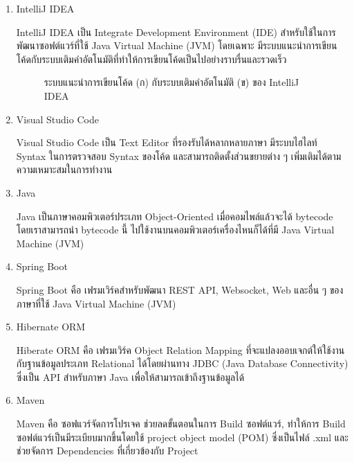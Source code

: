 \begin{enumerate}
	\item IntelliJ IDEA
	
	IntelliJ IDEA เป็น Integrate Development Environment (IDE) สำหรับใช้ในการพัฒนาซอฟต์แวร์ที่ใช้ Java Virtual Machine (JVM) โดยเฉพาะ มีระบบแนะนำการเขียนโค้ดกับระบบเติมคำอัตโนมัติที่ทำให้การเขียนโค้ดเป็นไปอย่างราบรื่นและรวดเร็ว ~\cite{intellij}
	
	\begin{figure}[!h]
		\centering
		\caption{ระบบแนะนำการเขียนโค้ด (ก) กับระบบเติมคำอัตโนมัติ (ข) ของ IntelliJ IDEA}
		\label{Fig:intellij}
	\end{figure}
	
	\item Visual Studio Code
	
	Visual Studio Code เป็น Text Editor ที่รองรับได้หลากหลายภาษา มีระบบไฮไลท์ Syntax ในการตรวจสอบ Syntax ของโค้ด และสามารถติดตั้งส่วนขยายต่าง ๆ เพิ่มเติมได้ตามความเหมาะสมในการทำงาน ~\cite{vscode}
	
	\item Java
	
	Java เป็นภาษาคอมพิวเตอร์ประเภท Object-Oriented เมื่อคอมไพล์แล้วจะได้ bytecode โดยเราสามารถนำ bytecode นี้ ไปใช้งานบนคอมพิวเตอร์เครื่องไหนก็ได้ที่มี Java Virtual Machine (JVM) ~\cite{java}
	
	\item Spring Boot
	
	Spring Boot คือ เฟรมเวิร์คสำหรับพัฒนา REST API, Websocket, Web และอื่น ๆ ของภาษาที่ใช้ Java Virtual Machine (JVM) ~\cite{spring}
	
	\item Hibernate ORM
	
	Hiberate ORM คือ เฟรมเวิร์ค Object Relation Mapping ที่จะแปลงออบเจกต์ให้ใช้งานกับฐานข้อมูลประเภท Relational ได้โดยผ่านทาง JDBC (Java Database Connectivity) ซึ่งเป็น API สำหรับภาษา Java เพื่อให้สามารถเข้าถึงฐานข้อมูลได้ ~\cite{hibernate}

	\item Maven
	
	Maven คือ ซอฟแวร์จัดการโปรเจค ช่วยลดขั้นตอนในการ Build ซอฟต์แวร์, ทำให้การ Build ซอฟต์แวร์เป็นมีระเบียบมากขึ้นโดยใช้ project object model (POM) ซึ่งเป็นไฟล์ .xml และช่วยจัดการ Dependencies ที่เกี่ยวข้องกับ Project ~\cite{maven}
	

\end{enumerate}

